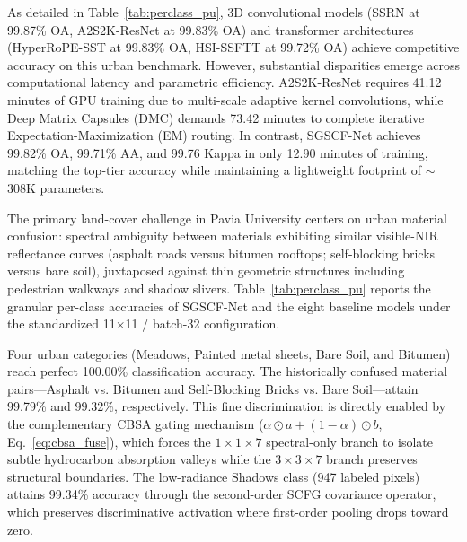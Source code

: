 \documentclass[manuscript,screen,review]{acmart}
\begin{document}
As detailed in Table~\ref{tab:perclass_pu}, 3D convolutional models (SSRN at 99.87\% OA, A2S2K-ResNet at 99.83\% OA) and transformer architectures (HyperRoPE-SST at 99.83\% OA, HSI-SSFTT at 99.72\% OA) achieve competitive accuracy on this urban benchmark. However, substantial disparities emerge across computational latency and parametric efficiency. A2S2K-ResNet requires 41.12 minutes of GPU training due to multi-scale adaptive kernel convolutions, while Deep Matrix Capsules (DMC) demands 73.42 minutes to complete iterative Expectation-Maximization (EM) routing. In contrast, SGSCF-Net achieves 99.82\% OA, 99.71\% AA, and 99.76 Kappa in only 12.90 minutes of training, matching the top-tier accuracy while maintaining a lightweight footprint of $\sim$308K parameters.

The primary land-cover challenge in Pavia University centers on urban material confusion: spectral ambiguity between materials exhibiting similar visible-NIR reflectance curves (asphalt roads versus bitumen rooftops; self-blocking bricks versus bare soil), juxtaposed against thin geometric structures including pedestrian walkways and shadow slivers. Table~\ref{tab:perclass_pu} reports the granular per-class accuracies of SGSCF-Net and the eight baseline models under the standardized 11$\times$11 / batch-32 configuration.

Four urban categories (Meadows, Painted metal sheets, Bare Soil, and Bitumen) reach perfect 100.00\% classification accuracy. The historically confused material pairs---Asphalt vs. Bitumen and Self-Blocking Bricks vs. Bare Soil---attain 99.79\% and 99.32\%, respectively. This fine discrimination is directly enabled by the complementary CBSA gating mechanism ($\alpha \odot a + (1-\alpha) \odot b$, Eq.~\ref{eq:cbsa_fuse}), which forces the $1\times 1\times 7$ spectral-only branch to isolate subtle hydrocarbon absorption valleys while the $3\times 3\times 7$ branch preserves structural boundaries. The low-radiance Shadows class (947 labeled pixels) attains 99.34\% accuracy through the second-order SCFG covariance operator, which preserves discriminative activation where first-order pooling drops toward zero.
\end{document}
